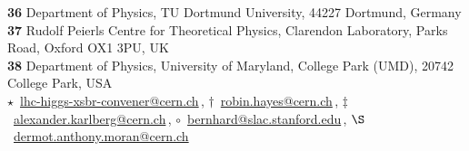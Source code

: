 \documentclass{SciPost_better_arXiv}
\begin{document}
\begin{center}
{  {\bf 36} Department of Physics, TU Dortmund University, 44227 Dortmund, Germany\\
  {\bf 37} Rudolf Peierls Centre for Theoretical Physics, Clarendon Laboratory, Parks Road, Oxford OX1 3PU, UK\\
  {\bf 38} Department of Physics, University of Maryland, College Park (UMD), 20742 College Park, USA
 }
\\[\baselineskip]
$\star$~\href{mailto:lhc-higgs-xsbr-convener@cern.ch}{\small lhc-higgs-xsbr-convener@cern.ch}\,,\quad
$\dagger$~\href{mailto:robin.hayes@cern.ch}{\small robin.hayes@cern.ch}\,,\quad
$\ddagger$~\href{mailto:alexander.karlberg@cern.ch}{\small alexander.karlberg@cern.ch}\,,\quad
$\circ$~\href{mailto:bernhard@slac.stanford.edu}{\small bernhard@slac.stanford.edu}\,,\quad
$\S$~\href{mailto:dermot.anthony.moran@cern.ch}{\small dermot.anthony.moran@cern.ch}
\end{center}
\clearpage
\end{document}
